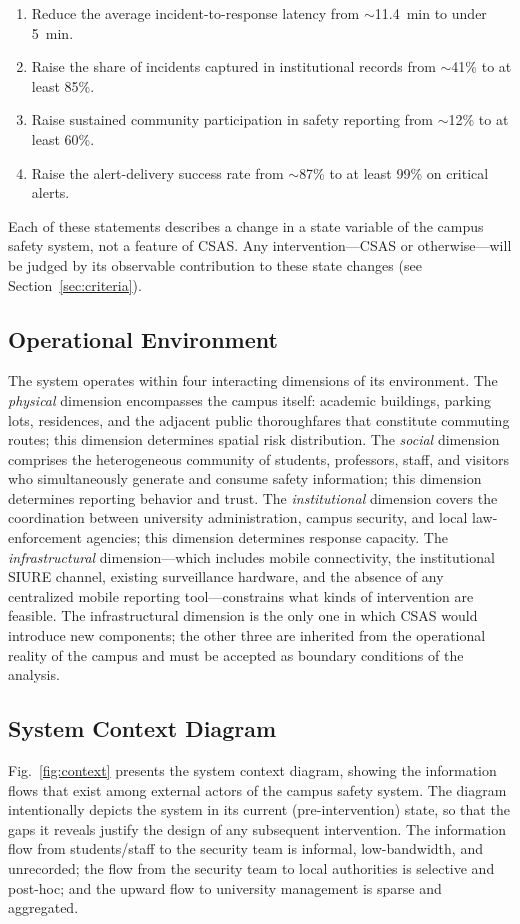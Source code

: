 \documentclass[conference]{IEEEtran}
\begin{document}
\begin{enumerate}[leftmargin=*,itemsep=2pt]
\item Reduce the average incident-to-response latency from
      \(\sim\)11.4~min to under 5~min.
\item Raise the share of incidents captured in institutional records
      from \(\sim\)41\% to at least 85\%.
\item Raise sustained community participation in safety reporting from
      \(\sim\)12\% to at least 60\%.
\item Raise the alert-delivery success rate from \(\sim\)87\% to at
      least 99\% on critical alerts.
\end{enumerate}

Each of these statements describes a change in a state variable of the
campus safety system, not a feature of CSAS. Any intervention---CSAS
or otherwise---will be judged by its observable contribution to these
state changes (see Section~\ref{sec:criteria}).

\subsection{Operational Environment}
The system operates within four interacting dimensions of its
environment. The \emph{physical} dimension encompasses the campus
itself: academic buildings, parking lots, residences, and the
adjacent public thoroughfares that constitute commuting routes; this
dimension determines spatial risk distribution. The \emph{social}
dimension comprises the heterogeneous community of students,
professors, staff, and visitors who simultaneously generate and
consume safety information; this dimension determines reporting
behavior and trust. The \emph{institutional} dimension covers the
coordination between university administration, campus security, and
local law-enforcement agencies; this dimension determines response
capacity. The \emph{infrastructural} dimension---which includes mobile
connectivity, the institutional SIURE channel, existing surveillance
hardware, and the absence of any centralized mobile reporting
tool---constrains what kinds of intervention are feasible. The
infrastructural dimension is the only one in which CSAS would
introduce new components; the other three are inherited from the
operational reality of the campus and must be accepted as
boundary conditions of the analysis.

\subsection{System Context Diagram}
Fig.~\ref{fig:context} presents the system context diagram, showing
the information flows that exist among external actors of the campus
safety system. The diagram intentionally depicts the system in its
current (pre-intervention) state, so that the gaps it reveals justify
the design of any subsequent intervention. The information flow from
students/staff to the security team is informal, low-bandwidth, and
unrecorded; the flow from the security team to local authorities is
selective and post-hoc; and the upward flow to university management
is sparse and aggregated.
\end{document}
